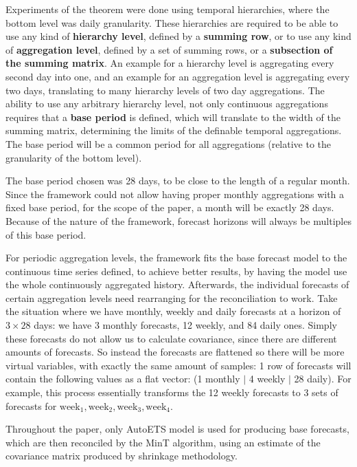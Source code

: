 \documentclass[sn-basic,Numbered,iicol]{sn-jnl}
\theoremstyle{thmstyleone}%
\theoremstyle{thmstyletwo}%
\theoremstyle{thmstylethree}%
\begin{document}
Experiments of the theorem were done using temporal hierarchies, where the bottom level was daily granularity. These hierarchies are required to be able to use any kind of \textbf{hierarchy level}, defined by a \textbf{summing row}, or to use any kind of \textbf{aggregation level}, defined by a set of summing rows, or a \textbf{subsection of the summing matrix}. An example for a hierarchy level is aggregating every second day into one, and an example for an aggregation level is aggregating every two days, translating to many hierarchy levels of two day aggregations. The ability to use any arbitrary hierarchy level, not only continuous aggregations requires that a \textbf{base period} is defined, which will translate to the width of the summing matrix, determining the limits of the definable temporal aggregations. The base period will be a common period for all aggregations (relative to the granularity of the bottom level).

The base period chosen was 28 days, to be close to the length of a regular month. Since the framework could not allow having proper monthly aggregations with a fixed base period, for the scope of the paper, a month will be exactly 28 days. Because of the nature of the framework, forecast horizons will always be multiples of this base period.

For periodic aggregation levels, the framework fits the base forecast model to the continuous time series defined, to achieve better results, by having the model use the whole continuously aggregated history. Afterwards, the individual forecasts of certain aggregation levels need rearranging for the reconciliation to work. Take the situation where we have monthly, weekly and daily forecasts at a horizon of $3 \times 28$ days: we have 3 monthly forecasts, 12 weekly, and 84 daily ones. Simply these forecasts do not allow us to calculate covariance, since there are different amounts of forecasts. So instead the forecasts are flattened so there will be more virtual variables, with exactly the same amount of samples: 1 row of forecasts will contain the following values as a flat vector: (1 monthly $|$ 4 weekly $|$ 28 daily). For example, this process essentially transforms the 12 weekly forecasts to 3 sets of forecasts for $\text{week}_1, \text{week}_2, \text{week}_3, \text{week}_4$.

Throughout the paper, only AutoETS model is used for producing base forecasts, which are then reconciled by the MinT algorithm, using an estimate of the covariance matrix produced by shrinkage methodology.
\end{document}
